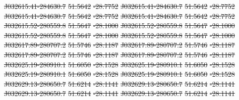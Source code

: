 \documentclass[11pt, a4paper]{book}
\providecommand{\DIFdeltex}[1]{{\protect\color{red}\sout{#1}}}                      %
\providecommand{\DIFdel}[1]{\texorpdfstring{\DIFdeltex{#1}}{}} %
\begin{document}
\DIFdel{J032615.41-284630.7 }%
\DIFdel{51.5642 }%
\DIFdel{-28.7752 }%
\DIFdel{J032615.41-284630.7 }%
\DIFdel{51.5642 }%
\DIFdel{-28.7752 }%
\DIFdel{J032615.41-284630.7 }%
\DIFdel{51.5642 }%
\DIFdel{-28.7752 }%
\DIFdel{J032615.41-284630.7 }%
\DIFdel{51.5642 }%
\DIFdel{-28.7752 }%
\DIFdel{J032615.52-280559.8 }%
\DIFdel{51.5647 }%
\DIFdel{-28.1000 }%
\DIFdel{J032615.52-280559.8 }%
\DIFdel{51.5647 }%
\DIFdel{-28.1000 }%
\DIFdel{J032615.52-280559.8 }%
\DIFdel{51.5647 }%
\DIFdel{-28.1000 }%
\DIFdel{J032615.52-280559.8 }%
\DIFdel{51.5647 }%
\DIFdel{-28.1000 }%
\DIFdel{J032617.89-280707.2 }%
\DIFdel{51.5746 }%
\DIFdel{-28.1187 }%
\DIFdel{J032617.89-280707.2 }%
\DIFdel{51.5746 }%
\DIFdel{-28.1187 }%
\DIFdel{J032617.89-280707.2 }%
\DIFdel{51.5746 }%
\DIFdel{-28.1187 }%
\DIFdel{J032617.89-280707.2 }%
\DIFdel{51.5746 }%
\DIFdel{-28.1187 }%
\DIFdel{J032625.19-280910.1 }%
\DIFdel{51.6050 }%
\DIFdel{-28.1528 }%
\DIFdel{J032625.19-280910.1 }%
\DIFdel{51.6050 }%
\DIFdel{-28.1528 }%
\DIFdel{J032625.19-280910.1 }%
\DIFdel{51.6050 }%
\DIFdel{-28.1528 }%
\DIFdel{J032625.19-280910.1 }%
\DIFdel{51.6050 }%
\DIFdel{-28.1528 }%
\DIFdel{J032629.13-280650.7 }%
\DIFdel{51.6214 }%
\DIFdel{-28.1141 }%
\DIFdel{J032629.13-280650.7 }%
\DIFdel{51.6214 }%
\DIFdel{-28.1141 }%
\DIFdel{J032629.13-280650.7 }%
\DIFdel{51.6214 }%
\DIFdel{-28.1141 }%
\DIFdel{J032629.13-280650.7 }%
\DIFdel{51.6214 }%
\DIFdel{-28.1141 }%
\end{document}
